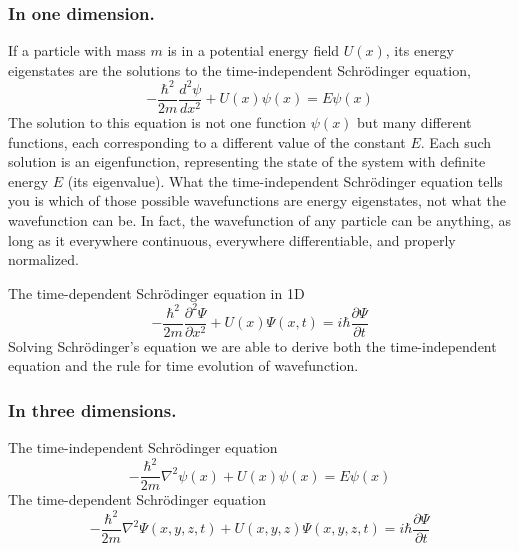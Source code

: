 \documentclass[../../../main.tex]{subfiles}
\begin{document}
\subsubsection{In one dimension.} If a particle with mass $m$ is in a potential energy field $U(x)$, its energy eigenstates are the solutions to the time-independent Schrödinger equation,
\begin{equation*}
    -\frac{\hbar^2}{2m}\frac{d^2\psi}{dx^2}+U(x)\psi(x)=E\psi(x)
\end{equation*}
The solution to this equation is not one function $\psi(x)$ but many different functions, each corresponding to a different value of the constant $E$. Each such solution is an eigenfunction, representing the state of the system with definite energy $E$ (its eigenvalue). What the time-independent Schrödinger equation tells you is which of those possible wavefunctions are energy eigenstates, not what the wavefunction can be. In fact, the wavefunction of any particle can be anything, as long as it everywhere continuous, everywhere differentiable, and properly normalized.

The time-dependent Schrödinger equation in 1D
\begin{equation*}
    -\frac{\hbar^2}{2m}\frac{\partial^2{\Psi}}{\partial x^2}+U(x)\Psi(x,t)=i\hbar \frac{\partial {\Psi}}{\partial t}
\end{equation*}
Solving Schrödinger's equation we are able to derive both the time-independent equation and the rule for time evolution of wavefunction.

\subsubsection{In three dimensions.}  The time-independent Schrödinger equation
\begin{equation*}
    -\frac{\hbar^2}{2m}\nabla^2\psi (x)+U(x)\psi(x)=E\psi(x)
\end{equation*}
The time-dependent Schrödinger equation
\begin{equation*}
    -\frac{\hbar^2}{2m}\nabla^2 {\Psi}(x,y,z,t) + U(x,y,z)  {\Psi}(x,y,z,t) = i\hbar \frac{\partial {\Psi}}{\partial t}
\end{equation*}
\end{document}
